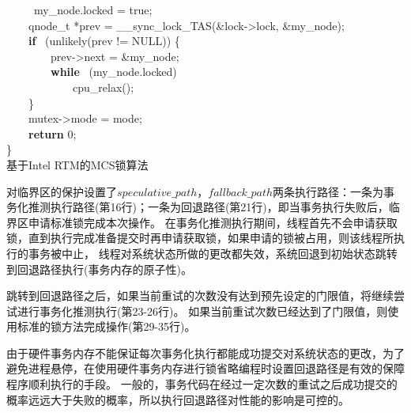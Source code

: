 \begin{algorithm}[htbp]
        \ 
        ~~~~my\_node.locked = true;\\
        ~~~~qnode\_t *prev = \_\_sync\_lock\_TAS(\&lock->lock, \&my\_node);\\
        ~~~~\textbf{if} ~(unlikely(prev != NULL)) \{\\
                ~~~~~~~~prev->next = \&my\_node;\\
                ~~~~~~~~\textbf{while}~ (my\_node.locked)\\
                        ~~~~~~~~~~~~cpu\_relax();\\
        ~~~~\}\\
        ~~~~mutex->mode = mode;\\
        ~~~~\textbf{return} 0; \\
\}\\
\caption{基于Intel RTM的MCS锁算法}
\label{algo:mcs_lock}
\end{algorithm}
对临界区的保护设置了$speculative\_path$，$fallback\_path$两条执行路径：一条为事务化推测执行路径(第16行)；一条为回退路径(第21行)，即当事务执行失败后，临界区申请标准锁完成本次操作。
在事务化推测执行期间，线程首先不会申请获取锁，直到执行完成准备提交时再申请获取锁，如果申请的锁被占用，则该线程所执行的事务被中止，
线程对系统状态所做的更改都失效，系统回退到初始状态跳转到回退路径执行(事务内存的原子性)。

跳转到回退路径之后，如果当前重试的次数没有达到预先设定的门限值，将继续尝试进行事务化推测执行(第23-26行)。
如果当前重试次数已经达到了门限值，则使用标准的锁方法完成操作(第29-35行)。

由于硬件事务内存不能保证每次事务化执行都能成功提交对系统状态的更改，为了避免进程悬停，在使用硬件事务内存进行锁省略编程时设置回退路径是有效的保障程序顺利执行的手段。
一般的，事务代码在经过一定次数的重试之后成功提交的概率远远大于失败的概率，所以执行回退路径对性能的影响是可控的。

